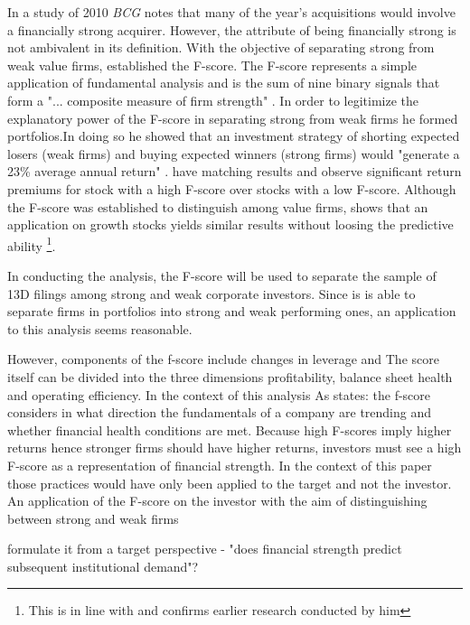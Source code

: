 \documentclass[12pt]{article}
\begin{document}
 In a study of 2010 \emph{BCG} notes that many of the year's acquisitions would involve a financially strong acquirer. However, the attribute of being financially strong is not ambivalent in its definition. With the objective of separating strong from weak value firms, \citet{Piotroski2000} established the F-score. The F-score represents a simple application of fundamental analysis and is the sum of nine binary signals that form a "... composite measure of firm strength" \citep[p. 496]{Fama2006}. In order to legitimize the explanatory power of the F-score in separating strong from weak firms he formed portfolios.In doing so he showed that an investment strategy of shorting expected losers (weak firms) and buying expected winners (strong firms) would "generate a 23\% average annual return" \citep[p. 4]{Piotroski2000}. \citet{Hyde2014} have matching results and observe significant return premiums for stock with a high F-score over stocks with a low F-score. Although the F-score was established to distinguish among value firms, \citet{Mohr2012} shows that an application on growth stocks yields similar results without loosing the predictive ability \footnote{This is in line with \citet{Piotroski2000} and confirms earlier research conducted by him}.

 In conducting the analysis, the F-score will be used to separate  the sample of 13D filings among strong and weak corporate investors. Since is is able to separate firms in portfolios into strong and weak performing ones, an application to this analysis seems reasonable. 
 
 However, components of the f-score include changes in leverage and The score itself can be divided into the three dimensions profitability, balance sheet health and operating efficiency. 
 In the context of this analysis As \citet{Mohr2012} states: the f-score considers in what direction the fundamentals of a company are trending and whether financial health conditions are met.  Because high F-scores imply higher returns hence stronger firms should have higher returns, investors must see a high F-score as a representation of financial strength. In the context of this paper those practices would have only been applied to the target and not the investor. An application of the F-score on the investor with the aim of distinguishing between strong and weak firms 


\citet{Choi2012} formulate it from a target perspective - "does financial strength predict subsequent institutional demand"? 
\end{document}
